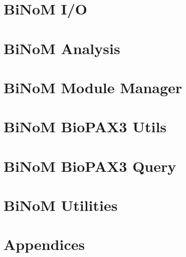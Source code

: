 \documentclass[11pt]{article}
\begin{document}
\section{BiNoM I/O}

\clearpage
\section{BiNoM Analysis}

\clearpage
\section{BiNoM Module Manager}

\clearpage
\section{BiNoM BioPAX3 Utils}

\clearpage
\section{BiNoM BioPAX3 Query}

\clearpage
\section{BiNoM Utilities}

\clearpage
\section{Appendices}

\clearpage
 
 
\end{document}
